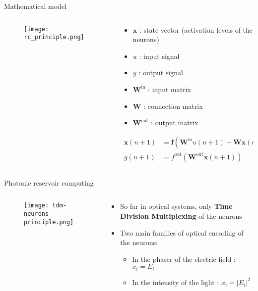 \begin{frame}{Mathematical model}

	\begin{columns}
		\begin{column}{.5\textwidth}
			\begin{figure}
				\centering
				\texttt{[image: rc\_principle.png]}
				\caption{\cite{financialTimeSeries}}
			\end{figure}
		\end{column}%
		\begin{column}{.5\textwidth}
			\begin{itemize}
				\item $\mathbf{x}$ : state vector (activation levels of the neurons)
				\item $u$ : input signal
				\item $y$ : output signal
				\item $\mathbf{W}^{\text{in}}$ : input matrix
				\item $\mathbf{W}$ : connection matrix
				\item $\mathbf{W}^{\text{out}}$ : output matrix
			\end{itemize}
			\begin{alertblock}{}
				\begin{align}
				\mathbf{x}(n+1) &= \mathbf{f} \left( \mathbf{W}^{\text{in}} u(n+1) + \mathbf{W} \mathbf{x}(n) \right) \nonumber \\
				y(n+1) &= f^{\text{out}}\left( \mathbf{W}^{\text{out}} \mathbf{x}(n+1) \right) \nonumber
			\end{align}
			\end{alertblock}
		\end{column}
	\end{columns}

\end{frame}

\begin{frame}{Photonic reservoir computing}
	\begin{columns}
		\begin{column}{.5\textwidth}
			\begin{figure}
				\centering
				\texttt{[image: tdm-neurons-principle.png]}
			\end{figure}
		\end{column}%
		\begin{column}{.5\textwidth}
			\begin{itemize}
				\item So far in optical systems, only \textbf{Time Division Multiplexing} of the neurons
				\item Two main families of optical encoding of the neurons:
				\begin{itemize}
					\item In the phaser of the electric field : $x_i = E_i$
					\item In the intensity of the light : $x_i = |E_i|^2$
				\end{itemize}
			\end{itemize}
		\end{column}
	\end{columns}
\end{frame}

